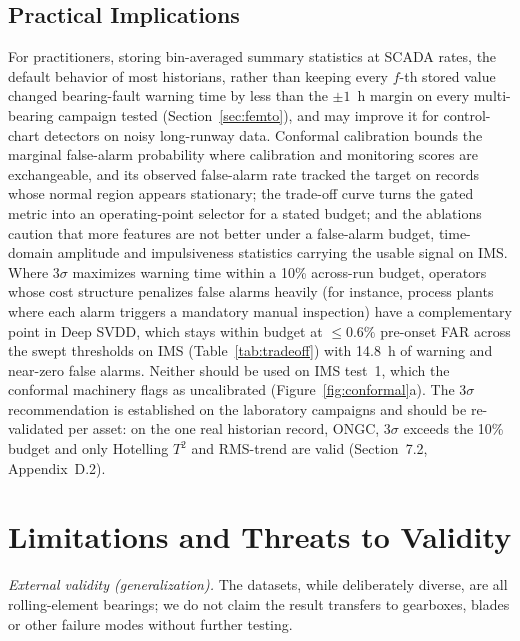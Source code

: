 \documentclass[IJPHM, 2026, 0]{PHMSociety}
\begin{document}
\subsection{Practical Implications}
\label{sec:practical}
For practitioners, storing bin-averaged summary statistics at SCADA rates, the default behavior of most historians, rather than keeping every $f$-th stored value changed bearing-fault warning time by less than the $\pm 1$~h margin on every multi-bearing campaign tested (Section~\ref{sec:femto}), and may improve it for control-chart detectors on noisy long-runway data. Conformal calibration bounds the marginal false-alarm probability where calibration and monitoring scores are exchangeable, and its observed false-alarm rate tracked the target on records whose normal region appears stationary; the trade-off curve turns the gated metric into an operating-point selector for a stated budget; and the ablations caution that more features are not better under a false-alarm budget, time-domain amplitude and impulsiveness statistics carrying the usable signal on IMS. Where $3\sigma$ maximizes warning time within a 10\% across-run budget, operators whose cost structure penalizes false alarms heavily (for instance, process plants where each alarm triggers a mandatory manual inspection) have a complementary point in Deep SVDD, which stays within budget at $\le 0.6\%$ pre-onset FAR across the swept thresholds on IMS (Table~\ref{tab:tradeoff}) with 14.8~h of warning and near-zero false alarms. Neither should be used on IMS test~1, which the conformal machinery flags as uncalibrated (Figure~\ref{fig:conformal}a). The $3\sigma$ recommendation is established on the laboratory campaigns and should be re-validated per asset: on the one real historian record, ONGC, $3\sigma$ exceeds the 10\% budget and only Hotelling $T^2$ and RMS-trend are valid (Section~7.2, Appendix~D.2).

\section{Limitations and Threats to Validity}
\label{sec:limitations}
\emph{External validity (generalization).} The datasets, while deliberately diverse, are all rolling-element bearings; we do not claim the result transfers to gearboxes, blades or other failure modes without further testing.
\end{document}
